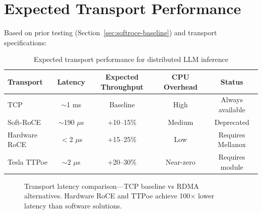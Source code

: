 \documentclass[11pt,letterpaper]{article}
\theoremstyle{definition}
\begin{document}
\section{Expected Transport Performance}
\label{app:transport-performance}

Based on prior testing (Section~\ref{sec:softroce-baseline}) and transport specifications:

\begin{table}[htbp]
\centering
\small
\begin{tabular}{@{}lcccc@{}}
\toprule
\textbf{Transport} & \textbf{Latency} & \textbf{Expected Throughput} & \textbf{CPU Overhead} & \textbf{Status} \\
\midrule
TCP & $\sim$1 ms & Baseline & High & Always available \\
Soft-RoCE & $\sim$190 $\mu$s & +10--15\% & Medium & Deprecated \\
Hardware RoCE & $<$2 $\mu$s & +15--25\% & Low & Requires Mellanox \\
Tesla TTPoe & $\sim$2 $\mu$s & +20--30\% & Near-zero & Requires module \\
\bottomrule
\end{tabular}
\caption{Expected transport performance for distributed LLM inference}
\end{table}

\begin{figure}[htbp]
\centering
{}
\caption{Transport latency comparison---TCP baseline vs RDMA alternatives. Hardware RoCE and TTPoe achieve 100$\times$ lower latency than software solutions.}
\label{fig:transport-latency-comparison}
\end{figure}
\end{document}
